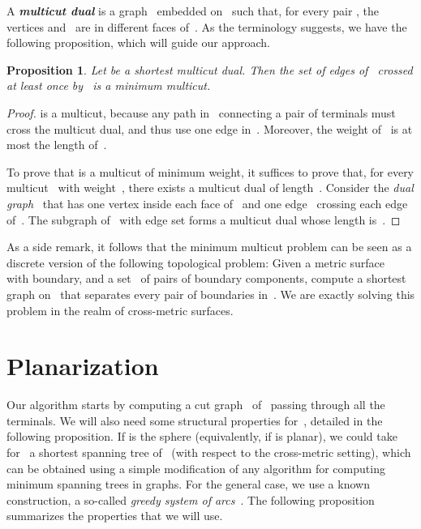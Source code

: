 \documentclass[11pt]{article}
\newcommand{\emphdef}[1]{\textcolor{blueblack}{\textbf{\emph{#1}}}}
\theoremstyle{plain}  \newtheorem{theorem}{Theorem}[section]
\newtheorem{proposition}[theorem]{Proposition}
\theoremstyle{definition}
\begin{document}
A \emphdef{multicut dual} is a graph~ embedded on~ such that, for
every pair , the vertices  and~ are in different
faces of~.  As the terminology suggests, we have the following
proposition, which will guide our approach.
\begin{proposition}\label{P:dual}
  Let  be a shortest multicut dual.  Then the set  of edges of~
  crossed at least once by~ is a minimum multicut.
\end{proposition}
\begin{proof}
   is a multicut, because any path in~ connecting a pair of
  terminals  must cross the multicut dual, and thus use
  one edge in~.  Moreover, the weight of~ is at most the length
  of~.

  To prove that  is a multicut of minimum weight, it suffices to prove
  that, for every multicut~ with weight~, there exists a multicut
  dual of length~.  Consider the \emph{dual graph}~ that has one
  vertex inside each face of~ and one edge~ crossing each edge~
  of~.  The subgraph of~ with edge set 
  forms a multicut dual whose length is~.
\end{proof}

As a side remark, it follows that the minimum multicut problem can be seen
as a discrete version of the following topological problem: Given a metric
surface~ with boundary, and a set~ of pairs of boundary components,
compute a shortest graph on~ that separates every pair of boundaries
in~.  We are exactly solving this problem in the realm of cross-metric
surfaces.

\section{Planarization}\label{S:cutgraph}

Our algorithm starts by computing a cut graph~ of~ passing through
all the terminals.  We will also need some structural properties for~,
detailed in the following proposition.  If  is the sphere (equivalently,
if  is planar), we could take for~ a shortest spanning tree of~
(with respect to the cross-metric setting), which can be obtained using a
simple modification of any algorithm for computing minimum spanning trees
in graphs.  For the general case, we use a known construction, a so-called
\emph{greedy system of arcs}~\cite{ccelw-scsh-08}.  The following
proposition summarizes the properties that we will use.
\end{document}
